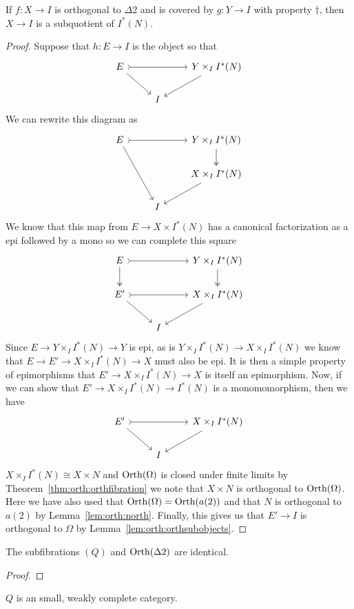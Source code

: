 \begin{thm}\label{thm:orth:seporth}
  If $f : X \to I$ is orthogonal to $\Delta 2$ and is covered by
  $g : Y \to I$ with property $\dagger$, then $X \to I$ is a
  subquotient of $I^*(N)$.
\end{thm}
\begin{proof}
  Suppose that $h : E \to I$ is the object so that
  \[
    \begin{tikzcd}
      E \ar[rr, rightarrowtail] \ar[dr] & & Y \times_I I^*(N) \ar[dl]\\
      & I &
    \end{tikzcd}
  \]
  We can rewrite this diagram as
  \[
    \begin{tikzcd}
      E \ar[rr, rightarrowtail] \ar[ddr] & & Y \times_I I^*(N) \ar[d, twoheadrightarrow]\\
      & & X \times_I I^*(N) \ar[dl]\\
      & I &
    \end{tikzcd}
  \]
  We know that this map from $E \to X \times I^*(N)$ has a canonical
  factorization as a epi followed by a mono so we can complete this
  square
  \[
    \begin{tikzcd}
      E \ar[rr, rightarrowtail] \ar[d, twoheadrightarrow] & & Y \times_I I^*(N) \ar[d, twoheadrightarrow]\\
      E' \ar[rr, rightarrowtail] \ar[dr] & & X \times_I I^*(N) \ar[dl]\\
      & I &
    \end{tikzcd}
  \]
  Since $E \to Y \times_I I^*(N) \to Y$ is epi, as is
  $Y \times_I I^*(N) \to X \times_I I^*(N)$ we know that
  $E \to E' \to X \times_I I^*(N) \to X$ must also be epi. It is then a
  simple property of epimorphisms that $E' \to X \times_I I^*(N) \to X$
  is itself an epimorphism. Now, if we can show that
  $E' \to X \times_I I^*(N) \to I^*(N)$ is a monomomorphism, then we
  have
  \[
    \begin{tikzcd}
      E' \ar[rr, rightarrowtail] \ar[dr] & & X \times_I I^*(N) \ar[dl]\\
      & I &
    \end{tikzcd}
  \]
  $X \times_I I^*(N) \cong X \times N$ and $\operatorname{Orth}(\Omega)$ is closed
  under finite limits by Theorem~\ref{thm:orth:orthfibration} we note
  that $X \times N$ is orthogonal to $\operatorname{Orth}(\Omega)$. Here we have
  also used that $\operatorname{Orth}(\Omega) = \operatorname{Orth}(a(2))$ and that $N$ is
  orthogonal to $a(2)$ by Lemma~\ref{lem:orth:north}. Finally, this
  gives us that $E' \to I$ is orthogonal to $\Omega$ by
  Lemma~\ref{lem:orth:orthsubobjects}.
\end{proof}
\begin{thm}\label{defn:orth:seporth}
  The subfibrations $(Q)$ and $\operatorname{Orth}(\Delta 2)$ are identical.
\end{thm}
\begin{proof}
\end{proof}
\begin{cor}
  $Q$ is an small, weakly complete category.
\end{cor}

